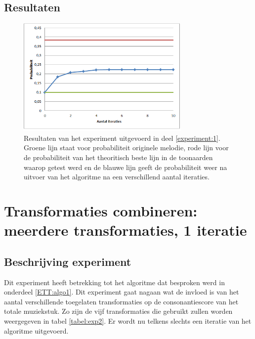 \subsection{Resultaten}

\begin{figure}[!ht]
  \centering
  \includegraphics[width=0.75\textwidth]{5_Experimenten_Resultaten/exp1_res}
  \caption{Resultaten van het experiment uitgevoerd in deel \ref{experiment:1}. Groene lijn staat voor probabiliteit originele melodie, rode lijn voor de probabiliteit van het theoritisch beste lijn in de toonaarden waarop getest werd en de blauwe lijn geeft de probabiliteit weer na uitvoer van het algoritme na een verschillend aantal iteraties.}
  \label{figuur:exp1}
\end{figure}

\section{Transformaties combineren: meerdere transformaties, 1 iteratie}
\label{experiment:2}
\subsection{Beschrijving experiment}
Dit experiment heeft betrekking tot het algoritme dat besproken werd in onderdeel \ref{ETT:algo1}. Dit experiment gaat nagaan wat de invloed is van het aantal verschillende toegelaten transformaties op de consonantiescore van het totale muziekstuk. Zo zijn de vijf transformaties die gebruikt zullen worden weergegeven in tabel \ref{tabel:exp2}. Er wordt nu telkens slechts een iteratie van het algoritme uitgevoerd.

